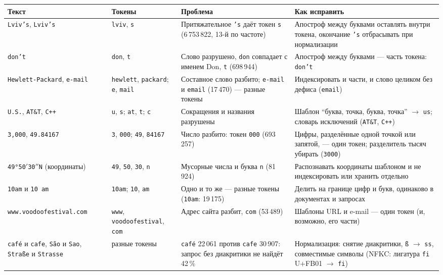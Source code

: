 {\small
\begin{longtable}{|>{\raggedright\arraybackslash}p{}|>{\raggedright\arraybackslash}p{}|>{\raggedright\arraybackslash}p{}|>{\raggedright\arraybackslash}p{}|}
\hline
Текст & Токены & Проблема & Как исправить \\
\hline
\endhead
\texttt{Lviv's}, \texttt{Lviv’s} & \texttt{lviv}, \texttt{s} & Притяжательное \texttt{'s} даёт токен \texttt{s} (6\,753\,822, 13-й по частоте) & Апостроф между буквами оставлять внутри токена, окончание \texttt{'s} отбрасывать при нормализации \\
\hline
\texttt{don't} & \texttt{don}, \texttt{t} & Слово разрушено, \texttt{don} совпадает с именем Don, \texttt{t} (698\,944) & Апостроф между буквами --- часть токена: \texttt{don't} \\
\hline
\texttt{Hewlett-Packard}, \texttt{e-mail} & \texttt{hewlett}, \texttt{packard}; \texttt{e}, \texttt{mail} & Составное слово разбито; \texttt{e-mail} и \texttt{email} (17\,470) --- разные токены & Индексировать и части, и слово целиком без дефиса (\texttt{email}) \\
\hline
\texttt{U.S.}, \texttt{AT\&T}, \texttt{C++} & \texttt{u}, \texttt{s}; \texttt{at}, \texttt{t}; \texttt{c} & Сокращения и названия разрушены & Шаблон \enquote{буква, точка, буква, точка} $\to$ \texttt{us}; словарь исключений (\texttt{AT\&T}, \texttt{C++}) \\
\hline
\texttt{3,000}, \texttt{49.84167} & \texttt{3}, \texttt{000}; \texttt{49}, \texttt{84167} & Число разбито: токен \texttt{000} (693\,257) & Цифры, разделённые одной точкой или запятой, --- один токен; разделитель тысяч убирать (\texttt{3000}) \\
\hline
\texttt{49°50$'$30$''$N} (координаты) & \texttt{49}, \texttt{50}, \texttt{30}, \texttt{n} & Мусорные числа и буква \texttt{n} (81\,924) & Распознавать координаты шаблоном и не индексировать или хранить отдельно \\
\hline
\texttt{10am} и \texttt{10 am} & \texttt{10am}; \texttt{10}, \texttt{am} & Одно и то же --- разные токены (\texttt{10am}: 19\,175) & Делить на границе цифр и букв, одинаково в документах и запросах \\
\hline
\texttt{www.\allowbreak voodoofestival.\allowbreak com} & \texttt{www}, \texttt{voodoofestival}, \texttt{com} & Адрес сайта разбит, \texttt{com} (53\,489) & Шаблоны URL и e-mail --- один токен (и, возможно, его части) \\
\hline
\texttt{café} и \texttt{cafe}, \texttt{São} и \texttt{Sao}, \texttt{Straße} и \texttt{Strasse} & разные токены & \texttt{café} 22\,061 против \texttt{cafe} 30\,907: запрос без диакритики не найдёт 42\,\% & Нормализация: снятие диакритики, \texttt{ß} $\to$ \texttt{ss}, совместимые символы (NFKC: лигатура \texttt{fi} U+FB01 $\to$ \texttt{fi}) \\

\end{longtable}}
